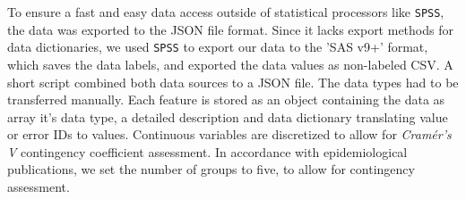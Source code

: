 \documentclass[journal]{style/vgtc} 			          %
\begin{document}
To ensure a fast and easy data access outside of statistical processors like \texttt{SPSS}, the data was exported to the JSON file format.
%
Since it lacks export methods for data dictionaries, we used \texttt{SPSS} to export our data to the 'SAS v9+' format, which saves the data labels, and exported the data values as non-labeled CSV.
%
A short script combined both data sources to a JSON file.
%
The data types had to be transferred manually.
%
Each feature is stored as an object containing the data as array it's data type, a detailed description and data dictionary translating value or error IDs to values.
%
Continuous variables are discretized to allow for \emph{Cram\'{e}r's V} contingency coefficient assessment.
%
In accordance with epidemiological publications, we set the number of groups to five, to allow for contingency assessment.
\end{document}
